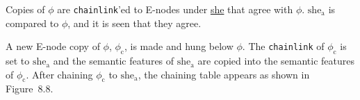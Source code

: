 \documentclass{article}
\begin{document}
\bigbreak
\vbox{}
\bigbreak

Copies of \underline{${\phi}$} are \texttt{chainlink}'ed to E-nodes
under \underline{she} that agree with
\underline{${\phi}$}. \underline{${\textrm{she}_{\textrm{a}}}$} is compared to
\underline{${\phi}$}, and it is seen that they agree.

\bigbreak
\vbox{}
\bigbreak

\noindent A new E-node copy of \underline{${\phi}$},
\underline{${\phi_{\textrm{c}}}$}, is made and hung below \underline{${\phi}$}.  The
\texttt{chainlink} of \underline{${\phi_{\textrm{c}}}$} is set to
\underline{${\textrm{she}_{\textrm{a}}}$} and the semantic features of \underline{${\textrm{she}_{\textrm{a}}}$}
are copied into the semantic features of \underline{${\phi_{\textrm{c}}}$}. After
chaining \underline{${\phi_{\textrm{c}}}$} to \underline{${\textrm{she}_{\textrm{a}}}$}, the chaining
table appears as shown in Figure~8.8.
\end{document}
